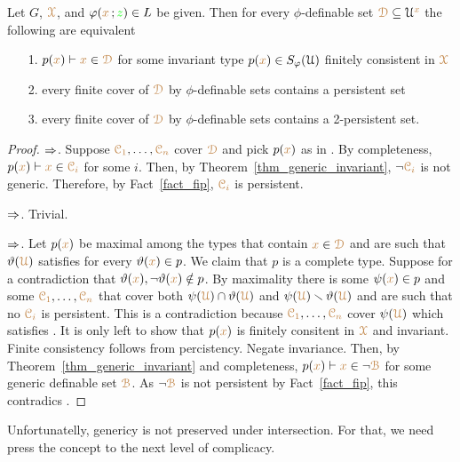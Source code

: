 \begin{theorem}\label{thm_generic_invariant2}
  Let $G$,  ${\color{brown}\EuScript X}$, and $\varphi({\color{brown} x}\,;{\color{green} z})\in L$ be given.
  Then for every $\phi$-definable set ${\color{brown}\EuScript D}\subseteq\EuScript U^{\color{brown} x}$ the following are equivalent 
  \begin{itemize}
    \item[1.] $p({\color{brown} x})\vdash{\color{brown}x}\in{\color{brown}\EuScript D}$ for some invariant type $p({\color{brown} x})\in S_\varphi(\EuScript U)$ finitely consistent in ${\color{brown}\EuScript X}$
    \item[2.] every finite cover of ${\color{brown}\EuScript D}$ by $\phi$-definable sets contains a persistent set
    \item[3.] every finite cover of ${\color{brown}\EuScript D}$ by $\phi$-definable sets contains a 2-persistent set.
  \end{itemize}
\end{theorem}

\begin{proof}
  $\Rightarrow$.
  Suppose ${\color{brown}\EuScript C_1},\dots,{\color{brown}\EuScript C_n}$ cover ${\color{brown}\EuScript D}$ and pick $p({\color{brown} x})$ as in .
  By completeness, $p({\color{brown} x})\vdash {\color{brown}x}\in{\color{brown}\EuScript C_i}$ for some $i$.
  Then, by Theorem~\ref{thm_generic_invariant}, $\neg{\color{brown}\EuScript C_i}$ is not generic.
  Therefore, by Fact~\ref{fact_fip}, ${\color{brown}\EuScript C_i}$ is persistent.
  
  $\Rightarrow$.
  Trivial.

  $\Rightarrow$.
  Let $p({\color{brown} x})$ be maximal among the types that contain ${\color{brown} x}\in{\color{brown}\EuScript D}$ and are such that $\vartheta({\color{brown}\EuScript U})$ satisfies  for every $\vartheta({\color{brown} x})\in p$.
  We claim that $p$ is a complete type.
  Suppose for a contradiction that $\vartheta({\color{brown} x}),\neg\vartheta({\color{brown} x})\notin p$.
  By maximality there is some $\psi({\color{brown} x})\in p$ and some ${\color{brown}\EuScript C_1},\dots,{\color{brown}\EuScript C_n}$ that cover both $\psi({\color{brown}\EuScript U})\cap\vartheta({\color{brown}\EuScript U})$ and $\psi({\color{brown}\EuScript U})\smallsetminus\vartheta({\color{brown}\EuScript U})$ and are such that no ${\color{brown}\EuScript C_i}$ is persistent.
  This is a contradiction because ${\color{brown}\EuScript C_1},\dots,{\color{brown}\EuScript C_n}$ cover $\psi({\color{brown}\EuScript U})$ which satisfies .
  It is only left to show that $p({\color{brown} x})$ is finitely consitent in ${\color{brown}\EuScript X}$ and invariant.
  Finite consistency follows from percistency.
  Negate invariance.
  Then, by Theorem~\ref{thm_generic_invariant} and completeness, $p({\color{brown} x})\vdash {\color{brown}x}\in\neg{\color{brown}\EuScript B}$ for some generic definable set ${\color{brown}\EuScript B}$.
  As $\neg{\color{brown}\EuScript B}$ is not persistent by Fact~\ref{fact_fip}, this contradics .
\end{proof}

Unfortunatelly, genericy is not preserved under intersection.
For that, we need press the concept to the next level of complicacy.

